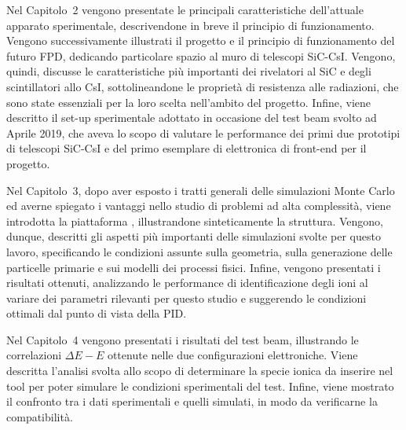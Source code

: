 Nel Capitolo~2 vengono presentate le principali caratteristiche dell'attuale apparato sperimentale, descrivendone in breve il principio di funzionamento.
Vengono successivamente illustrati il progetto e il principio di funzionamento del futuro FPD, dedicando particolare spazio al muro di telescopi SiC-CsI.
Vengono, quindi, discusse le caratteristiche più importanti dei rivelatori al SiC e degli scintillatori allo CsI, sottolineandone le proprietà di resistenza alle radiazioni, che sono state essenziali per la loro scelta nell'ambito del progetto.
Infine, viene descritto il set-up sperimentale adottato in occasione del test beam svolto ad Aprile 2019, che aveva lo scopo di valutare le performance dei primi due prototipi di telescopi SiC-CsI e del primo esemplare di elettronica di front-end per il progetto.

Nel Capitolo~3, dopo aver esposto i tratti generali delle simulazioni Monte Carlo ed averne spiegato i vantaggi nello studio di problemi ad alta complessità, viene introdotta la piattaforma \geant{}, illustrandone sinteticamente la struttura.
Vengono, dunque, descritti gli aspetti più importanti delle simulazioni svolte per questo lavoro, specificando le condizioni assunte sulla geometria, sulla generazione delle particelle primarie e sui modelli dei processi fisici.
Infine, vengono presentati i risultati ottenuti, analizzando le performance di identificazione degli ioni al variare dei parametri rilevanti per questo studio e suggerendo le condizioni ottimali dal punto di vista della PID.
 
Nel Capitolo~4 vengono presentati i risultati del test beam, illustrando le correlazioni $\Delta E - E$ ottenute nelle due configurazioni elettroniche.
Viene descritta l'analisi svolta allo scopo di determinare la specie ionica da inserire nel tool per poter simulare le condizioni sperimentali del test.
Infine, viene mostrato il confronto tra i dati sperimentali e quelli simulati, in modo da verificarne la compatibilità.

